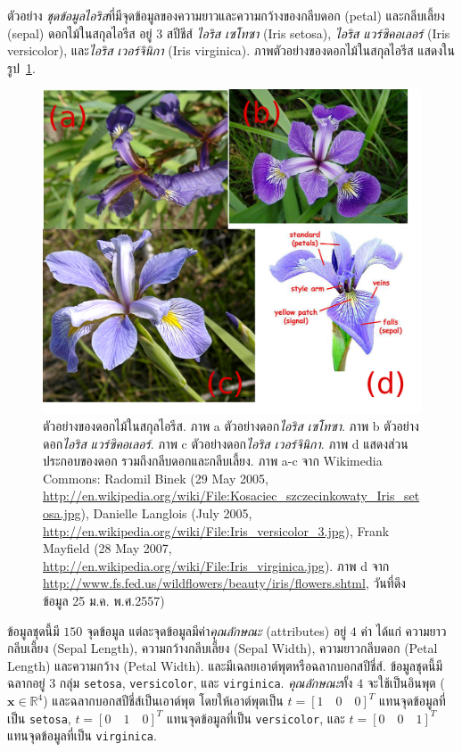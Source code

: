 ตัวอย่าง \textit{ชุดข้อมูลไอริส}ที่มีจุดข้อมูลของความยาวและความกว้างของกลีบดอก (petal) และกลีบเลี้ยง (sepal) ดอกไม้ในสกุลไอรีส อยู่ $3$ สปีชีส์
\textit{ไอริส เซโทซา} (Iris setosa), 
\textit{ไอริส แวร์ซิคอเลอร์} (Iris versicolor), 
และ\textit{ไอริส เวอร์จินิกา} (Iris virginica).
ภาพตัวอย่างของดอกไม้ในสกุลไอรีส แสดงในรูป~\ref{fig: linear Iris flowers}.

% 
\begin{figure}
\begin{center}
\includegraphics[width=5.5in]{03Linear/IrisPicsPNG.png}
\end{center}
\caption{ตัวอย่างของดอกไม้ในสกุลไอรีส.
ภาพ a ตัวอย่างดอก\textit{ไอริส เซโทซา}.
ภาพ b ตัวอย่างดอก\textit{ไอริส แวร์ซิคอเลอร์}.
ภาพ c ตัวอย่างดอก\textit{ไอริส เวอร์จินิกา}.
ภาพ d แสดงส่วนประกอบของดอก รวมถึงกลีบดอกและกลีบเลี้ยง.
{\footnotesize ภาพ a-c จาก Wikimedia Commons: Radomil Binek (29 May 2005, \url{http://en.wikipedia.org/wiki/File:Kosaciec_szczecinkowaty_Iris_setosa.jpg}), Danielle Langlois (July 2005, \url{http://en.wikipedia.org/wiki/File:Iris_versicolor_3.jpg}), Frank Mayfield (28 May 2007, \url{http://en.wikipedia.org/wiki/File:Iris_virginica.jpg}).
ภาพ d จาก \url{http://www.fs.fed.us/wildflowers/beauty/iris/flowers.shtml}, วันที่ดึงข้อมูล 25 ม.ค. พ.ศ.2557)} }
\label{fig: linear Iris flowers}
\end{figure}
%

ข้อมูลชุดนี้มี $150$ จุดข้อมูล 
แต่ละจุดข้อมูลมีค่า\textit{คุณลักษณะ} (attributes) อยู่ $4$ ค่า
ได้แก่ ความยาวกลีบเลี้ยง (Sepal Length), 
ความกว้างกลีบเลี้ยง (Sepal Width), 
ความยาวกลีบดอก (Petal Length) 
และความกว้าง (Petal Width).
และมีเฉลยเอาต์พุตหรือฉลากบอกสปีชี่ส์.
ข้อมูลชุดนี้มีฉลากอยู่ $3$ กลุ่ม \texttt{setosa}, \texttt{versicolor}, และ \texttt{virginica}.
\textit{คุณลักษณะ}ทั้ง $4$ จะใช้เป็นอินพุต ($\mathbf{x} \in \mathbb{R}^4$) 
และฉลากบอกสปีชี่ส์เป็นเอาต์พุต 
โดยให้เอาต์พุตเป็น 
$t = [1 \quad 0 \quad 0]^T$ แทนจุดข้อมูลที่เป็น \texttt{setosa}, 
$t = [0 \quad 1 \quad 0]^T$ แทนจุดข้อมูลที่เป็น \texttt{versicolor}, 
และ $t = [0 \quad 0 \quad 1]^T$ แทนจุดข้อมูลที่เป็น \texttt{virginica}.


